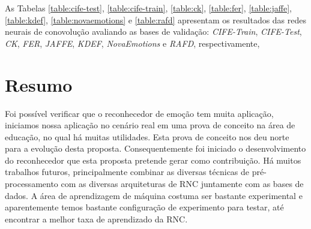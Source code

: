 As Tabelas \ref{table:cife-test}, \ref{table:cife-train}, \ref{table:ck}, \ref{table:fer}, \ref{table:jaffe}, \ref{table:kdef}, \ref{table:novaemotions} e \ref{table:rafd} apresentam os resultados das redes neurais de conovolução avaliando as bases de validação: \textit{CIFE-Train}, \textit{CIFE-Test}, \textit{CK}, \textit{FER}, \textit{JAFFE}, \textit{KDEF}, \textit{NovaEmotions} e \textit{RAFD}, respectivamente, 


\section{Resumo}\label{sec:considera}
Foi possível verificar que o reconhecedor de emoção tem muita aplicação, iniciamos nossa aplicação no cenário real em uma prova de conceito na área de educação, no qual há muitas utilidades. Esta prova de conceito nos deu norte para a evolução desta proposta. Consequentemente foi iniciado o desenvolvimento do reconhecedor que esta proposta pretende gerar como contribuição. Há muitos trabalhos futuros, principalmente combinar as diversas técnicas de pré-processamento com as diversas arquiteturas de RNC juntamente com as bases de dados. A área de aprendizagem de máquina costuma ser bastante experimental e aparentemente temos bastante configuração de experimento para testar, até encontrar a melhor taxa de aprendizado da RNC.